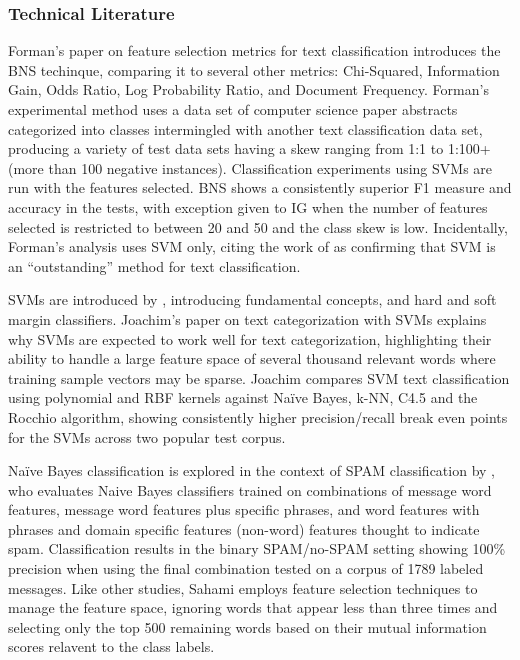 \documentclass[twoside,11pt]{article}
\begin{document}
\subsubsection{Technical Literature}
Forman's paper on feature selection metrics for text classification \citep{Forman} introduces the BNS techinque, comparing it to several other metrics:  Chi-Squared, Information Gain, Odds Ratio,  Log Probability Ratio, and Document Frequency. Forman's experimental method uses a data set of computer science paper abstracts categorized into classes intermingled with another text classification data set, producing a variety of test data sets having a skew ranging from 1:1 to 1:100+ (more than 100 negative instances). Classification experiments using SVMs are run with the features selected. BNS shows a consistently superior F1 measure and accuracy in the tests, with exception given to IG when the number of features selected is restricted to between 20 and 50 and the class skew is low. Incidentally, Forman's analysis uses SVM only, citing the work of \citep{Joachims} as confirming that SVM is an ``outstanding'' method for text classification.
\par SVMs are introduced by \citep{Vapnik}, introducing fundamental concepts, and hard and soft margin classifiers. Joachim's paper on text categorization with SVMs \citep{Joachim} explains why SVMs are expected to work well for text categorization, highlighting their ability to handle a large feature space of several thousand relevant words where training sample vectors may be sparse. Joachim compares SVM text classification using polynomial and RBF kernels against Na\"ive Bayes, k-NN, C4.5 and the Rocchio algorithm, showing consistently higher precision/recall break even points for the SVMs across two popular test corpus.
\par Na\"ive Bayes classification is explored in the context of SPAM classification by \citep{Sahami}, who evaluates Naive Bayes classifiers trained on combinations of message word features, message word features plus specific phrases, and word features with phrases and domain specific features (non-word) features thought to indicate spam. Classification results in the binary SPAM/no-SPAM setting showing 100\% precision when using the final combination tested on a corpus of 1789 labeled messages. Like other studies, Sahami employs feature selection techniques to manage the feature space, ignoring words that appear less than three times and selecting only the top 500 remaining words based on their mutual information scores relavent to the class labels.
\end{document}
